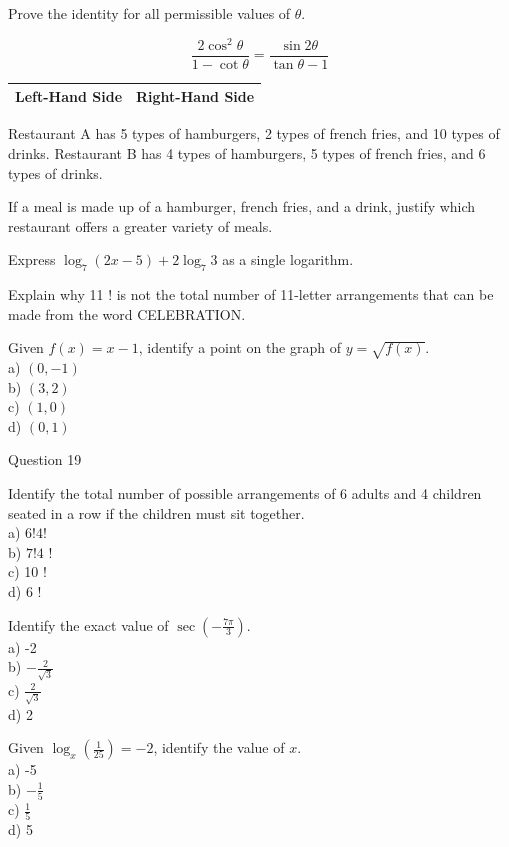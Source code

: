 \documentclass[10pt]{article}
\begin{document}
Prove the identity for all permissible values of $\theta$.

$$
\frac{2 \cos ^{2} \theta}{1-\cot \theta}=\frac{\sin 2 \theta}{\tan \theta-1}
$$

\begin{center}
\begin{tabular}{|l|l|}
\hline
Left-Hand Side & Right-Hand Side \\
\hline
\end{tabular}
\end{center}

Restaurant A has 5 types of hamburgers, 2 types of french fries, and 10 types of drinks. Restaurant B has 4 types of hamburgers, 5 types of french fries, and 6 types of drinks.

If a meal is made up of a hamburger, french fries, and a drink, justify which restaurant offers a greater variety of meals.

Express $\log _{7}(2 x-5)+2 \log _{7} 3$ as a single logarithm.

Explain why 11 ! is not the total number of 11-letter arrangements that can be made from the word CELEBRATION.

Given $f(x)=x-1$, identify a point on the graph of $y=\sqrt{f(x)}$.\\
a) $(0,-1)$\\
b) $(3,2)$\\
c) $(1,0)$\\
d) $(0,1)$

Question 19

Identify the total number of possible arrangements of 6 adults and 4 children seated in a row if the children must sit together.\\
a) $6!4!$\\
b) $7!4$ !\\
c) 10 !\\
d) 6 !

Identify the exact value of $\sec \left(-\frac{7 \pi}{3}\right)$.\\
a) -2\\
b) $-\frac{2}{\sqrt{3}}$\\
c) $\frac{2}{\sqrt{3}}$\\
d) 2

Given $\log _{x}\left(\frac{1}{25}\right)=-2$, identify the value of $x$.\\
a) -5\\
b) $-\frac{1}{5}$\\
c) $\frac{1}{5}$\\
d) 5
\end{document}
